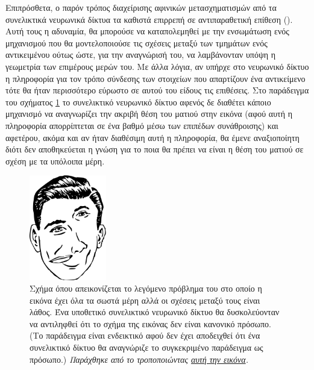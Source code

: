 Επιπρόσθετα, ο παρόν τρόπος διαχείρισης αφινικών μετασχηματισμών από τα συνελικτικά νευρωνικά δίκτυα τα καθιστά επιρρεπή σε αντιπαραθετική επίθεση (). Αυτή τους η αδυναμία, θα μπορούσε να καταπολεμηθεί με την ενσωμάτωση ενός μηχανισμού που θα μοντελοποιούσε τις σχέσεις μεταξύ των τμημάτων ενός αντικειμένου ούτως ώστε, για την αναγνώρισή του, να λαμβάνονταν υπόψη η γεωμετρία των επιμέρους μερών του. Με άλλα λόγια, αν υπήρχε  στο νευρωνικό δίκτυο η πληροφορία για τον τρόπο σύνδεσης των στοιχείων που απαρτίζουν ένα αντικείμενο τότε θα ήταν περισσότερο εύρωστο σε αυτού του είδους τις επιθέσεις. Στο παράδειγμα του σχήματος \ref{fig:picasso_face} το συνελικτικό νευρωνικό δίκτυο αφενός δε διαθέτει κάποιο μηχανισμό να αναγνωρίζει την ακριβή θέση του ματιού στην εικόνα (αφού αυτή η πληροφορία απορρίπτεται σε ένα βαθμό μέσω των επιπέδων συνάθροισης) και αφετέρου, ακόμα και αν ήταν διαθέσιμη αυτή η πληροφορία, θα έμενε αναξιοποίητη διότι δεν αποθηκεύεται η γνώση για το ποια θα πρέπει να είναι η θέση του ματιού σε σχέση με τα υπόλοιπα μέρη. \par

\begin{figure}[h]
  \centering
  \includegraphics[width=0.3\textwidth]{images/chapter theoritical background/picasso_problem_on_face.pdf}
  \caption{Σχήμα όπου απεικονίζεται το λεγόμενο πρόβλημα του  στο οποίο η εικόνα έχει όλα τα σωστά μέρη αλλά οι σχέσεις μεταξύ τους είναι λάθος. Ένα υποθετικό συνελικτικό νευρωνικό δίκτυο θα δυσκολεύονταν να αντιληφθεί ότι το σχήμα της εικόνας δεν είναι κανονικό πρόσωπο. (Το παράδειγμα είναι ενδεικτικό αφού δεν έχει αποδειχθεί ότι ένα συνελικτικό δίκτυο θα αναγνώριζε το συγκεκριμένο παράδειγμα ως πρόσωπο.) \textit{Παράχθηκε από το \href{https://inkscape.org/}{} τροποποιώντας \href{https://freesvg.org/vector-clip-art-of-long-thin-mans-face}{αυτή την εικόνα}.}} 
  \label{fig:picasso_face}
\end{figure}

